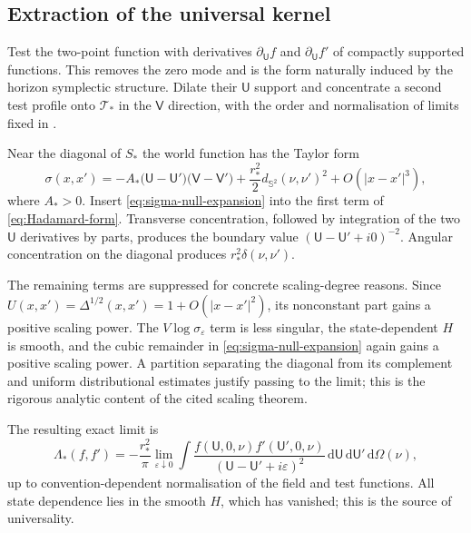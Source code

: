 \documentclass[11pt,a4paper]{article}
\theoremstyle{definition}
\theoremstyle{remark}
\newcommand{\eps}{\varepsilon}
\newcommand{\dd}{\mathrm d}
\begin{document}
	\subsection{Extraction of the universal kernel}
	
	Test the two-point function with derivatives
	$\partial_{\mathsf U}f$ and $\partial_{\mathsf U}f'$ of compactly supported
	functions.  This removes the zero mode and is the form naturally induced by
	the horizon symplectic structure.  Dilate their $\mathsf U$ support and
	concentrate a second test profile onto $\mathcal T_*$ in the $\mathsf V$
	direction, with the order and normalisation of limits fixed in
	\cite{KurpiczPinamontiVerch2021}.
	
	Near the diagonal of $S_*$ the world function has the Taylor form
	\begin{equation}
		\sigma(x,x')=
		-A_*\bigl(\mathsf U-\mathsf U'\bigr)
		\bigl(\mathsf V-\mathsf V'\bigr)
		+\frac{r_*^2}{2}d_{\mathbb S^2}(\nu,\nu')^2
		+O(|x-x'|^3),
		\label{eq:sigma-null-expansion}
	\end{equation}
	where $A_*>0$.  Insert \eqref{eq:sigma-null-expansion} into the first term of
	\eqref{eq:Hadamard-form}.  Transverse concentration, followed by integration
	of the two $\mathsf U$ derivatives by parts, produces the boundary value
	$(\mathsf U-\mathsf U'+i0)^{-2}$.  Angular concentration on the diagonal
	produces $r_*^2\delta(\nu,\nu')$.
	
	The remaining terms are suppressed for concrete scaling-degree reasons.
	Since $U(x,x')=\Delta^{1/2}(x,x')=1+O(|x-x'|^2)$, its nonconstant part gains a
	positive scaling power.  The $V\log\sigma_\eps$ term is less singular, the
	state-dependent $H$ is smooth, and the cubic remainder in
	\eqref{eq:sigma-null-expansion} again gains a positive scaling power.  A
	partition separating the diagonal from its complement and uniform
	distributional estimates justify passing to the limit; this is the rigorous
	analytic content of the cited scaling theorem.
	
	The resulting exact limit is
	\begin{equation}
		\Lambda_*(f,f')
		=-\frac{r_*^2}{\pi}
		\lim_{\eps\downarrow0}
		\int
		\frac{f(\mathsf U,0,\nu)f'(\mathsf U',0,\nu)}
		{(\mathsf U-\mathsf U'+i\eps)^2}
		\,\dd\mathsf U\,\dd\mathsf U'\,\dd\Omega(\nu),
		\label{eq:KPV-scaling}
	\end{equation}
	up to convention-dependent normalisation of the field and test functions.
	All state dependence lies in the smooth $H$, which has vanished; this is the
	source of universality.
	
\end{document}
